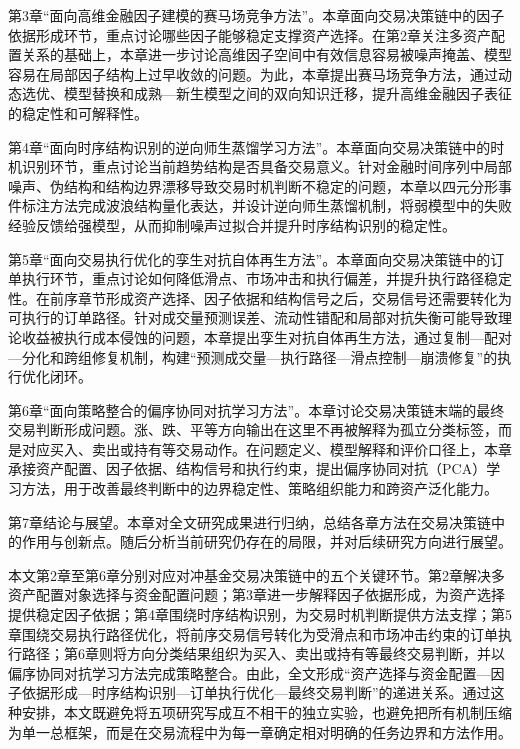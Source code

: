 第3章“面向高维金融因子建模的赛马场竞争方法”。本章面向交易决策链中的因子依据形成环节，重点讨论哪些因子能够稳定支撑资产选择。在第2章关注多资产配置关系的基础上，本章进一步讨论高维因子空间中有效信息容易被噪声掩盖、模型容易在局部因子结构上过早收敛的问题。为此，本章提出赛马场竞争方法，通过动态选优、模型替换和成熟—新生模型之间的双向知识迁移，提升高维金融因子表征的稳定性和可解释性。

第4章“面向时序结构识别的逆向师生蒸馏学习方法”。本章面向交易决策链中的时机识别环节，重点讨论当前趋势结构是否具备交易意义。针对金融时间序列中局部噪声、伪结构和结构边界漂移导致交易时机判断不稳定的问题，本章以四元分形事件标注方法完成波浪结构量化表达，并设计逆向师生蒸馏机制，将弱模型中的失败经验反馈给强模型，从而抑制噪声过拟合并提升时序结构识别的稳定性。

第5章“面向交易执行优化的孪生对抗自体再生方法”。本章面向交易决策链中的订单执行环节，重点讨论如何降低滑点、市场冲击和执行偏差，并提升执行路径稳定性。在前序章节形成资产选择、因子依据和结构信号之后，交易信号还需要转化为可执行的订单路径。针对成交量预测误差、流动性错配和局部对抗失衡可能导致理论收益被执行成本侵蚀的问题，本章提出孪生对抗自体再生方法，通过复制—配对—分化和跨组修复机制，构建“预测成交量—执行路径—滑点控制—崩溃修复”的执行优化闭环。

第6章“面向策略整合的偏序协同对抗学习方法”。本章讨论交易决策链末端的最终交易判断形成问题。涨、跌、平等方向输出在这里不再被解释为孤立分类标签，而是对应买入、卖出或持有等交易动作。在问题定义、模型解释和评价口径上，本章承接资产配置、因子依据、结构信号和执行约束，提出偏序协同对抗（PCA）学习方法，用于改善最终判断中的边界稳定性、策略组织能力和跨资产泛化能力。

第7章结论与展望。本章对全文研究成果进行归纳，总结各章方法在交易决策链中的作用与创新点。随后分析当前研究仍存在的局限，并对后续研究方向进行展望。

本文第2章至第6章分别对应对冲基金交易决策链中的五个关键环节。第2章解决多资产配置对象选择与资金配置问题；第3章进一步解释因子依据形成，为资产选择提供稳定因子依据；第4章围绕时序结构识别，为交易时机判断提供方法支撑；第5章围绕交易执行路径优化，将前序交易信号转化为受滑点和市场冲击约束的订单执行路径；第6章则将方向分类结果组织为买入、卖出或持有等最终交易判断，并以偏序协同对抗学习方法完成策略整合。由此，全文形成“资产选择与资金配置—因子依据形成—时序结构识别—订单执行优化—最终交易判断”的递进关系。通过这种安排，本文既避免将五项研究写成互不相干的独立实验，也避免把所有机制压缩为单一总框架，而是在交易流程中为每一章确定相对明确的任务边界和方法作用。
